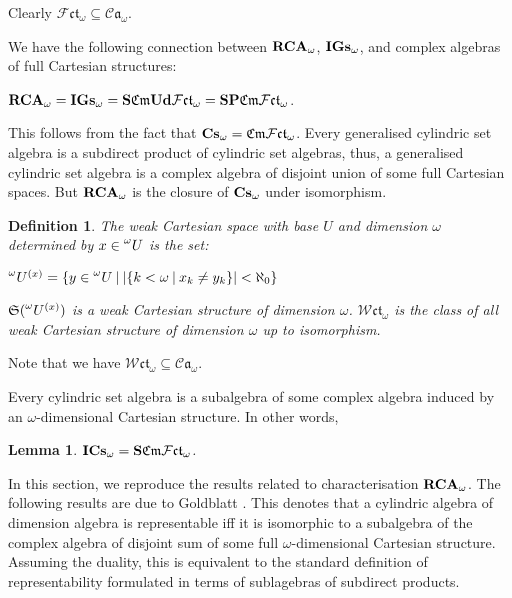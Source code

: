 \documentclass[a4paper]{article}
\theoremstyle{defin}
\newtheorem{defin}{Definition}
\theoremstyle{theorem}
\theoremstyle{prop}
\theoremstyle{lemma}
\newtheorem{lemma}{Lemma}
\theoremstyle{fact}
\theoremstyle{ex}
\theoremstyle{col}
\begin{document}
Clearly $\mathcal{F} \mathfrak{c}\mathfrak{t}_{\omega} \subseteq \mathcal{C}\mathfrak{a}_{\omega}$.

We have the following connection between ${\bf RCA}_{\omega}$, ${\bf IGs}_{\omega}$, and complex algebras of full Cartesian structures:
\begin{center}
${\bf RCA}_{\omega} = {\bf IGs}_{\omega} = {\bf S} \mathfrak{Cm} {\bf Ud} \mathcal{F} \mathfrak{c}\mathfrak{t}_{\omega} = {\bf S P} \mathfrak{Cm}  \mathcal{F} \mathfrak{c}\mathfrak{t}_{\omega}$.
\end{center}
This follows from the fact that ${\bf Cs}_{\omega} = \mathfrak{Cm} \mathcal{F} \mathfrak{c}\mathfrak{t}_{\omega}$. Every generalised cylindric set algebra is a subdirect product of cylindric set algebras, thus, a generalised cylindric set algebra is a complex algebra of disjoint union of some full Cartesian spaces. But ${\bf RCA}_{\omega}$ is the closure of ${\bf Cs}_{\omega}$ under isomorphism.

\begin{defin}
The weak Cartesian space with base $U$ and dimension $\omega$ determined by $x \in \prescript{\omega}{}U$ is the set:
\begin{center}
$\prescript{\omega}{}U^{(x)} = \{ y \in \prescript{\omega}{}U \: | \: |\{ k < \omega \: | \: x_k \neq y_k \}| < \aleph_0 \}$
\end{center}
$\mathfrak{S}(\prescript{\omega}{}U^{(x)})$ is a weak Cartesian structure of dimension $\omega$. $\mathcal{W} \mathfrak{ct}_{\omega}$ is the class of all weak Cartesian structure of dimension $\omega$ up to isomorphism.
\end{defin}
Note that we have $\mathcal{W} \mathfrak{ct}_{\omega} \subseteq \mathcal{C}\mathfrak{a}_{\omega}$.

Every cylindric set algebra is a subalgebra of some complex algebra induced by an $\omega$-dimensional Cartesian structure. In other words,

\begin{lemma}
${\bf I}{\bf Cs}_{\omega} = {\bf S} \mathfrak{Cm} \mathcal{F} \mathfrak{c}\mathfrak{t}_{\omega}$.
\end{lemma}


In this section, we reproduce the results related to characterisation ${\bf RCA}_{\omega}$. The following results are due to Goldblatt \cite{goldblatt1995elementary}. This denotes that a cylindric algebra of dimension algebra is representable iff it is isomorphic to a subalgebra of the complex algebra of disjoint sum of some full $\omega$-dimensional Cartesian structure. Assuming the duality, this is equivalent to the standard definition of representability formulated in terms of sublagebras of subdirect products.
\end{document}
